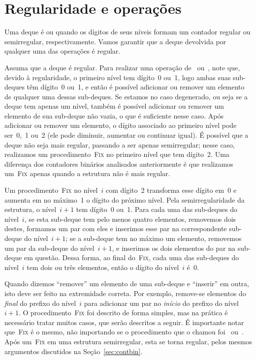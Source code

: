 \documentclass[main.tex]{subfiles}
\begin{document}
\section{Regularidade e operações} \label{sec:reg_op}

Uma deque é  ou  quando os dígitos de seus níveis formam um contador regular ou semirregular, respectivamente. Vamos garantir que a deque devolvida por qualquer uma das operações é regular.

Assuma que a deque é regular. Para realizar uma operação de~ ou~, note que, devido à regularidade, o primeiro nível tem dígito~0 ou~1, logo ambas suas sub-deques têm dígito~0 ou~1, e então é possível adicionar ou remover um elemento de qualquer uma dessas sub-deques. Se estamos no caso degenerado, ou seja se a deque tem apenas um nível, também é possível adicionar ou remover um elemento de sua sub-deque não vazia, o que é suficiente nesse caso.
Após adicionar ou remover um elemento, o dígito associado ao primeiro nível pode ser~0,~1 ou~2 (ele pode diminuir, aumentar ou continuar igual). É possível que a deque não seja mais regular, passando a ser apenas semirregular; nesse caso, realizamos um procedimento~\textsc{Fix} no primeiro nível que tem dígito~2. Uma diferença dos contadores binários analisados anteriormente é que realizamos um~\textsc{Fix} apenas quando a estrutura não é mais regular.

Um procedimento~\textsc{Fix} no nível~$i$ com dígito~2 transforma esse dígito em~0 e aumenta em no máximo~1 o dígito do próximo nível. Pela semirregularidade da estrutura, o nível~$i+1$ tem dígito~0 ou~1. Para cada uma das sub-deques do nível~$i$, se esta sub-deque tem pelo menos quatro elementos, removemos dois destes, formamos um par com eles e inserimos esse par na correspondente sub-deque do nível~$i+1$; se a sub-deque tem no máximo um elemento, removemos um par da sub-deque do nível~$i+1$, e inserimos os dois elementos do par na sub-deque em questão. Dessa forma, ao final do~\textsc{Fix}, cada uma das sub-deques do nível~$i$ tem dois ou três elementos, então o dígito do nível~$i$ é~0.

Quando dizemos ``remover'' um elemento de uma sub-deque e ``inserir'' em outra, isto deve ser feito na extremidade correta. Por exemplo, remove-se elementos do \emph{final} do prefixo do nível~$i$ para adicionar um par no \emph{início} do prefixo do nível~$i+1$. O procedimento~\textsc{Fix} foi descrito de forma simples, mas na prática é necessário tratar muitos casos, que serão descritos a seguir. É importante notar que~\textsc{Fix} é o mesmo, não importando se o procedimento que o chamou foi~ ou~. Após um~\textsc{Fix} em uma estrutura semirregular, esta se torna regular, pelos mesmos argumentos discutidos na Seção~\ref{sec:contbin}.
\end{document}
